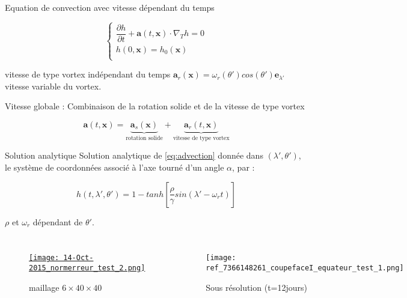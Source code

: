 \documentclass[11pt]{beamer}
\begin{document}
\begin{frame}{Equation de convection avec vitesse dépendant du temps}

\begin{block}{}
\begin{equation}
\left \{
\begin{array}{l}
\dfrac{\partial h}{\partial t} + \mathbf{a}(t,\mathbf{x}) \cdot \nabla_T h = 0\\[6pt]
h(0,\mathbf{x}) = h_0(\mathbf{x})\\
\end{array}
\right.
\label{eq:advection}
\end{equation}
\end{block}

\begin{block}{vitesse de type vortex indépendant du temps}
$\mathbf{a}_r(\mathbf{x}) = \omega_r (\theta') cos ( \theta') \mathbf{e}_{\lambda'}$ vitesse variable du vortex.
\end{block}


\begin{block}{Vitesse globale :
Combinaison de la rotation solide et de la vitesse de type vortex}

$$\mathbf{a}(t, \mathbf{x}) = \underbrace{\mathbf{a}_s ( \mathbf{x} )}_{\text{rotation solide}} + \underbrace{\mathbf{a}_r (t, \mathbf{x})}_{\text{vitesse de type vortex}}$$




\begin{flushright}
\end{flushright}
\end{block}

\end{frame}



\begin{frame}
\begin{block}{Solution analytique}
Solution analytique de \eqref{eq:advection} donnée dans $( \lambda', \theta')$, le système de coordonnées associé à l'axe tourné d'un angle $\alpha$, par :

$$h(t, \lambda', \theta') = 1 -tanh \left[ \frac{\rho}{\gamma} sin( \lambda' - \omega_r t ) \right]$$

$\rho$ et $\omega_r$ dépendant de $\theta'$.
\end{block}

\pause
\begin{columns}
\begin{figure}
\href{run:ref_7363145849_test_2.avi}{\texttt{[image: 14-Oct-2015\_normerreur\_test\_2.png]}} 
\caption{maillage $6 \times 40 \times 40$}
\end{figure}

\begin{figure}
\texttt{[image: ref\_7366148261\_coupefaceI\_equateur\_test\_1.png]}
\caption{Sous résolution (t=12jours)}
\end{figure}
\end{columns}

\end{frame}
\end{document}
